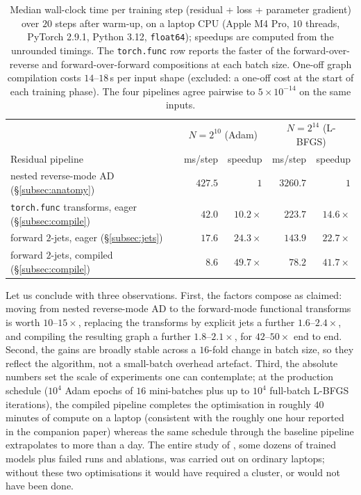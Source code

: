 \documentclass[oneside,british]{amsart}
\numberwithin{equation}{section}
\numberwithin{figure}{section}
\theoremstyle{plain}
\numberwithin{thm}{section}
\theoremstyle{plain}
\theoremstyle{plain}
\theoremstyle{definition}
\theoremstyle{remark}
\begin{document}
\begin{table}[t]
\centering
\begin{tabular}{lrrrr}
\toprule
 & \multicolumn{2}{c}{$N=2^{10}$ (Adam)} & \multicolumn{2}{c}{$N=2^{14}$ (L-BFGS)}\tabularnewline
Residual pipeline & ms/step & speedup & ms/step & speedup\tabularnewline
\midrule
nested reverse-mode AD (\S\ref{subsec:anatomy}) & $427.5$ & $1$ & $3260.7$ & $1$\tabularnewline
\texttt{torch.func} transforms, eager (\S\ref{subsec:compile}) & $42.0$ & $10.2\times$ & $223.7$ & $14.6\times$\tabularnewline
forward $2$-jets, eager (\S\ref{subsec:jets}) & $17.6$ & $24.3\times$ & $143.9$ & $22.7\times$\tabularnewline
forward $2$-jets, compiled (\S\ref{subsec:compile}) & $8.6$ & $49.7\times$ & $78.2$ & $41.7\times$\tabularnewline
\bottomrule
\end{tabular}
\medskip
\caption{Median wall-clock time per training step (residual + loss +
parameter gradient) over $20$ steps after warm-up, on a laptop CPU
(Apple M4 Pro, $10$ threads, PyTorch 2.9.1, Python 3.12,
\texttt{float64}); speedups are computed from the unrounded timings.
The \texttt{torch.func} row reports the faster of the
forward-over-reverse and forward-over-forward compositions at each
batch size. One-off graph compilation costs $14$--$18$\,s per input
shape (excluded: a one-off cost at the start of each training phase).
The four pipelines agree pairwise to $5\times10^{-14}$ on the same
inputs.}
\label{tab:bench}
\end{table}

Let us conclude with three observations. First, the factors compose as
claimed: moving from nested reverse-mode AD to the forward-mode
functional transforms is worth $10$--$15\times$, replacing the
transforms by explicit jets a further $1.6$--$2.4\times$, and
compiling the resulting graph a further $1.8$--$2.1\times$, for
$42$--$50\times$ end to end. Second, the gains are broadly stable across a $16$-fold change in batch size,
so they reflect the algorithm, not a small-batch overhead artefact.
Third, the absolute numbers set the
scale of experiments one can contemplate; at the production schedule
($10^{4}$ Adam epochs of $16$ mini-batches plus up to $10^{4}$
full-batch L-BFGS iterations), the compiled pipeline completes the
optimisation in roughly $40$ minutes of compute on a laptop (consistent
with the roughly one hour reported in the companion paper) whereas the same
schedule through the baseline pipeline extrapolates to more than a
day. The entire study of \cite{SchettiniUsula2026}, some dozens of
trained models plus failed runs and ablations, was carried out on
ordinary laptops; without these two optimisations it would have
required a cluster, or would not have been done.
\end{document}
